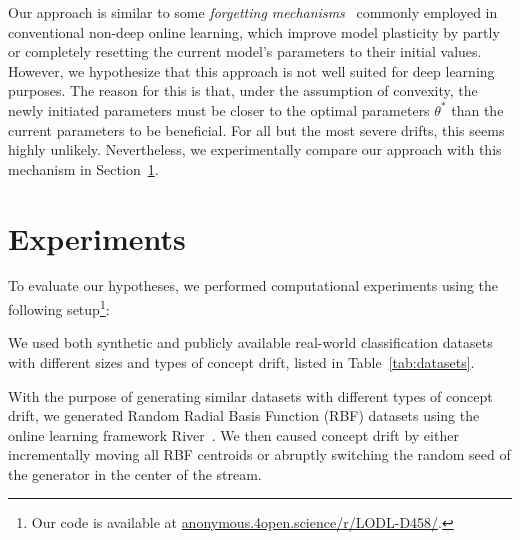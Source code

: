 \documentclass[letterpaper]{article} %
\begin{document}
Our approach is similar to some \textit{forgetting mechanisms}~\cite{gamaSurveyConceptDrift2014} commonly employed in conventional non-deep online learning, which improve model plasticity by partly~\cite{bifetAdaptiveLearningEvolving2009} or completely resetting the current model's parameters to their initial values.
However, we hypothesize that this approach is not well suited for deep learning purposes.
The reason for this is that, under the assumption of convexity, the newly initiated parameters must be closer to the optimal parameters $\theta^*$ than the current parameters to be beneficial.
For all but the most severe drifts, this seems highly unlikely.
Nevertheless, we experimentally compare our approach with this mechanism in Section~\ref{sec:experiments}.



\section{Experiments}\label{sec:experiments}

To evaluate our hypotheses, we performed computational experiments using the following setup\footnote[2]{Our code is available at \url{anonymous.4open.science/r/LODL-D458/}.}:

We used both synthetic and publicly available real-world classification datasets with different sizes and types of concept drift, listed in Table~\ref{tab:datasets}.

With the purpose of generating similar datasets with different types of concept drift, we generated Random Radial Basis Function (RBF) datasets using the online learning framework River~\cite{montiel2021river}. We then caused concept drift by either incrementally moving all RBF centroids or abruptly switching the random seed of the generator in the center of the stream.
\end{document}
